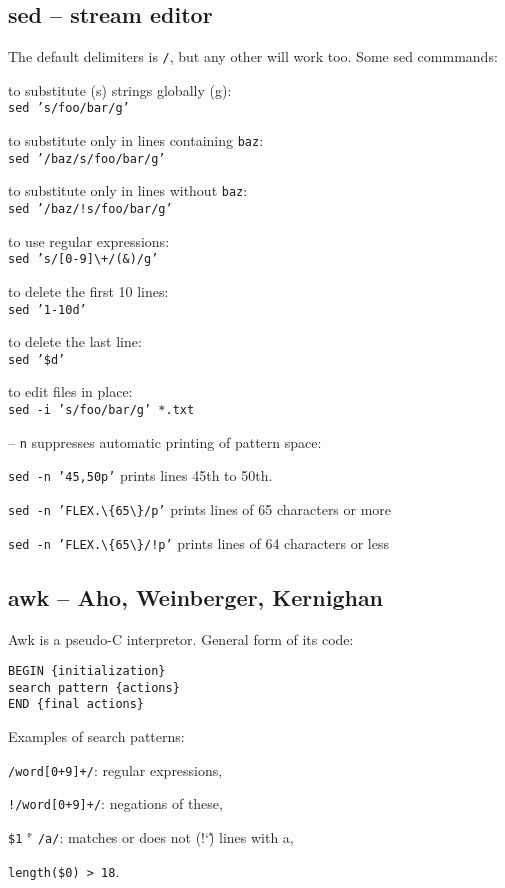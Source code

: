 
\subsection{sed -- stream editor}
The default delimiters is \texttt{/}, but any other will work too.
Some sed commmands:
\begin{enumx}
\item to substitute (s) strings globally (g):\\
\texttt{sed 's/foo/bar/g'}
\item to substitute only in lines containing \texttt{baz}:\\
\texttt{sed '/baz/s/foo/bar/g'}
\item to substitute only in lines without \texttt{baz}:\\
\texttt{sed '/baz/!s/foo/bar/g'}
\item to use regular expressions:\\
\texttt{sed 's/[0-9]\textbackslash+/(\&)/g'}
\item to delete the first 10 lines:\\
\texttt{sed '1-10d'}
\item to delete the last line:\\
\texttt{sed '\$d'}
\item to edit files in place:\\
\texttt{sed -i 's/foo/bar/g' *.txt}
\item [--] \texttt{n} suppresses automatic printing of pattern space:
\item \texttt{sed -n '45,50p'} \dotfill prints lines 45th to 50th.
\item \texttt{sed -n 'FLEX.\textbackslash\{65\textbackslash\}/p'} \dotfill prints lines of 65 characters or more
\item \texttt{sed -n 'FLEX.\textbackslash\{65\textbackslash\}/!p'} \dotfill prints lines of 64 characters or less
\end{enumx}

\subsection{awk -- Aho, Weinberger, Kernighan}
Awk is a pseudo-C interpretor.
General form of its code:
\begin{verbatim}
BEGIN {initialization}
search pattern {actions}
END {final actions}
\end{verbatim}

Examples of search patterns:
\begin{enumx}
	\item \texttt{/word[0+9]+/}: regular expressions,
	\item \texttt{!/word[0+9]+/}: negations of these,
	\item \texttt{\$1} \char`\~\, \texttt{/a/}: matches or does not (!\char`\~) lines with a,
	\item \texttt{length(\$0) > 18}.
\end{enumx} 

